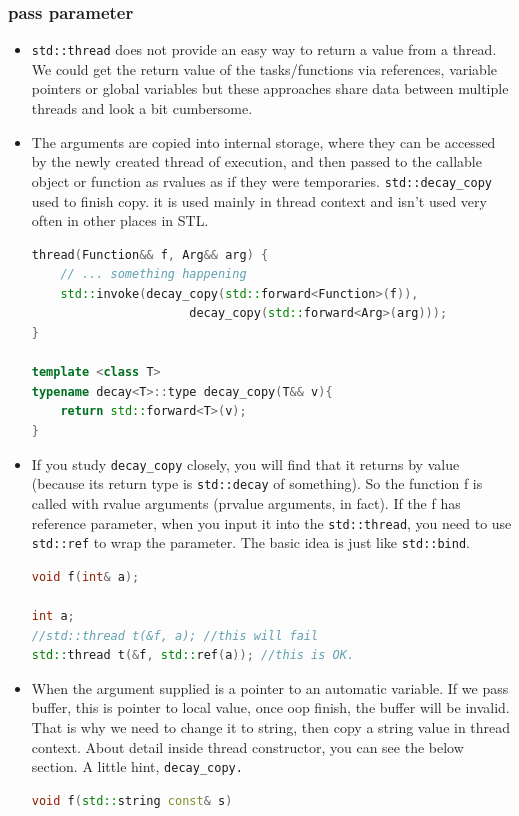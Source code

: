 \documentclass[a4paper,11pt,twoside]{book}
\begin{document}
\subsubsection{pass parameter}

\begin{itemize}
	\item \texttt{std::thread} does not provide an easy way to return a value from a thread. We could get the return value of the tasks/functions via references, variable pointers or global variables but these approaches share data between multiple threads and look a bit cumbersome.
	
	\item The arguments are copied into internal storage, where they can be accessed by the newly created thread of execution, and then passed to the callable object or function as rvalues as if they were temporaries. \texttt{std::decay\_copy} used to finish copy. it is used mainly in thread context and isn't used very often in other places in STL.
	
\begin{lstlisting}[frame=single, language=c++]
thread(Function&& f, Arg&& arg) {
	// ... something happening
	std::invoke(decay_copy(std::forward<Function>(f)),
	                  decay_copy(std::forward<Arg>(arg)));
}
	
template <class T> 
typename decay<T>::type decay_copy(T&& v){
	return std::forward<T>(v); 
}
\end{lstlisting}

	\item  If you study \texttt{decay\_copy} closely, you will find that it returns by value (because its return type is \texttt{std::decay} of something). So the function f is called with rvalue arguments (prvalue arguments, in fact). If the f has reference parameter, when you input it into the \texttt{std::thread}, you need to use \texttt{std::ref} to wrap the parameter.  The basic idea is just like \texttt{std::bind}. 

\begin{lstlisting}[frame=single, language=c++]
void f(int& a);

int a;
//std::thread t(&f, a); //this will fail
std::thread t(&f, std::ref(a)); //this is OK.
\end{lstlisting}

		\item When the argument supplied is a pointer to an automatic variable. If we pass buffer, this is pointer to local value, once oop finish, the buffer will be invalid. That is why we need to change it to string, then copy a string value in thread context. About detail inside thread constructor, you can see the below section. A little hint, \texttt{decay\_copy.}
\begin{lstlisting}[frame=single, language=c++]
void f(std::string const& s)
	

\end{lstlisting}
\end{itemize}
\end{document}
